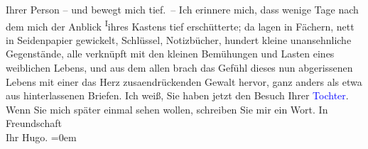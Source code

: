                     Ihrer Person – und bewegt mich tief. – Ich erinnere mich, dass wenige Tage nach
                    dem \label{K_L02496_1v}\label{K_L02496_1h} mich der Anblick \substVorne{}\textsuperscript{I}\substDazwischen{}i\substHinten{}hres Kastens tief erschütterte; da lagen in Fächern, nett in
                    Seidenpapier gewickelt, Schlüssel, Notizbücher, hundert kleine unansehnliche
                    Gegenstände, alle verknüpft mit den kleinen Bemühungen und Lasten eines
                    weiblichen Lebens, und aus dem allen brach das Gefühl dieses nun abgerissenen
                    Lebens mit einer das Herz zusa{\geminationm}endrückenden Gewalt
                    hervor, ganz anders als etwa aus hinterlassenen Briefen.\pend
           \pstart
           Ich weiß, Sie haben jetzt den Besuch Ihrer \textcolor{blue}{Tochter}{}. Wenn Sie mich später einmal sehen wollen,
                    schreiben Sie mir ein Wort.\pend
           \pstart
           In Freundschaft{\\[\baselineskip]}Ihr \spacefill\mbox{Hugo.}\pend
           \leftskip=0em{}\endnumbering{}  
      